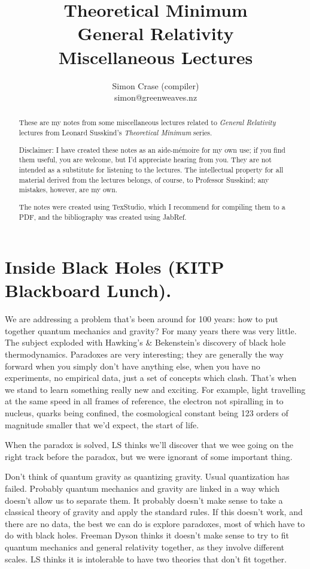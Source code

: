\documentclass[]{article}
\title{Theoretical Minimum\\General Relativity\\Miscellaneous Lectures}
\author{Simon Crase (compiler)\\simon@greenweaves.nz}
\begin{document}
	
\maketitle
	
\begin{abstract}
	These are my notes from some miscellaneous lectures related to  \emph{General Relativity}\cite{susskind2012general} lectures from Leonard Susskind's \emph{Theoretical Minimum} series\cite{susskind2007theoretical}.
	
	Disclaimer: I have created these notes as an aide-m\'emoire for my own use; if you find them useful, you are welcome, but I'd appreciate hearing from you. They are not intended 
	as a substitute for listening to the lectures. The intellectual property for all material derived from the lectures belongs, of course, to Professor Susskind; any mistakes, however, are my own.
	
	The notes were created using TexStudio\cite{TexStudio}, which I recommend for compiling them to a PDF, and the bibliography was created using JabRef\cite{Jabref}.
\end{abstract}
	
\tableofcontents
\listoffigures
\listoftables
\listoftheorems

\section{Inside Black Holes (KITP Blackboard Lunch).}\label{sec:inh}

We are addressing a problem that's been around for 100 years: how to put together quantum mechanics and gravity?  For many years there was very little. The subject exploded with Hawking's \& Bekenstein's discovery of black hole thermodynamics. Paradoxes are very interesting; they are generally the way forward when you simply don't have anything else, when you have no experiments, no empirical data, just a set of concepts which clash. That's when we stand to learn something really new and exciting. For example, light travelling at the same speed in all frames of reference, the electron not spiralling in to nucleus, quarks being confined, the cosmological constant being 123 orders of magnitude smaller that we'd expect, the start of life.\cite{susskind2013inside}

When the paradox is solved, LS thinks we'll discover that we wee going on the right track before the paradox, but we were ignorant of some important thing.

Don't think of quantum gravity as quantizing gravity. Usual quantization has failed. Probably quantum mechanics and gravity are linked in a way which doesn't allow us to separate them. It probably doesn't make sense to take a classical theory of gravity and apply the standard rules. If this doesn't work, and there are no data, the best we can do is explore paradoxes, most of which have to do with black holes. Freeman Dyson thinks it doesn't make sense to try to fit quantum mechanics and general relativity together, as they involve different scales. LS thinks it is intolerable to have two theories that don't fit together. 
\end{document}
